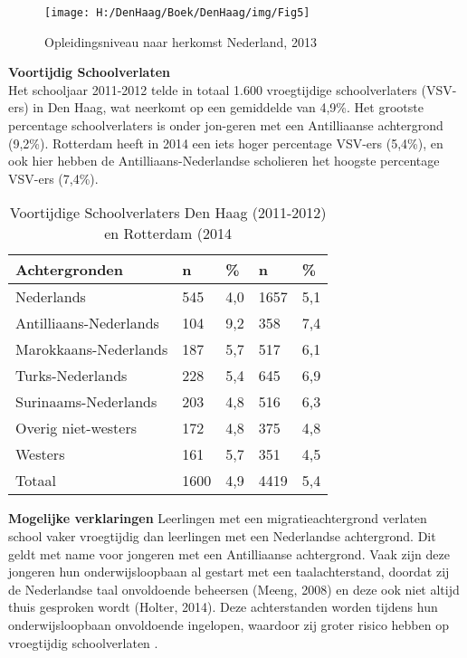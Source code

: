 \documentclass[]{book}
\begin{document}
\begin{figure}
\texttt{[image: H:/DenHaag/Boek/DenHaag/img/Fig5]} \caption{Opleidingsniveau naar herkomst Nederland, 2013}\label{fig:unnamed-chunk-5}
\end{figure}

\textbf{Voortijdig Schoolverlaten}\\
Het schooljaar 2011-2012 telde in totaal 1.600 vroegtijdige
schoolverlaters (VSV-ers) in Den Haag, wat neerkomt op een gemiddelde
van 4,9\%. Het grootste percentage schoolverlaters is onder jon-geren
met een Antilliaanse achtergrond (9,2\%). Rotterdam heeft in 2014 een
iets hoger percentage VSV-ers (5,4\%), en ook hier hebben de
Antilliaans-Nederlandse scholieren het hoogste percentage VSV-ers
(7,4\%).

\begin{table}

\caption{\label{tab:unnamed-chunk-6}Voortijdige Schoolverlaters Den Haag (2011-2012) en Rotterdam (2014}
\centering
\begin{tabular}[t]{l|l|l|l|l}
\hline
Achtergronden & n & \% & n & \%\\
\hline
Nederlands & 545 & 4,0 & 1657 & 5,1\\
\hline
Antilliaans-Nederlands & 104 & 9,2 & 358 & 7,4\\
\hline
Marokkaans-Nederlands & 187 & 5,7 & 517 & 6,1\\
\hline
Turks-Nederlands & 228 & 5,4 & 645 & 6,9\\
\hline
Surinaams-Nederlands & 203 & 4,8 & 516 & 6,3\\
\hline
Overig niet-westers & 172 & 4,8 & 375 & 4,8\\
\hline
Westers & 161 & 5,7 & 351 & 4,5\\
\hline
Totaal & 1600 & 4,9 & 4419 & 5,4\\
\hline
\end{tabular}
\end{table}

\textbf{Mogelijke verklaringen} Leerlingen met een migratieachtergrond
verlaten school vaker vroegtijdig dan leerlingen met een Nederlandse
achtergrond. Dit geldt met name voor jongeren met een Antilliaanse
achtergrond. Vaak zijn deze jongeren hun onderwijsloopbaan al gestart
met een taalachterstand, doordat zij de Nederlandse taal onvoldoende
beheersen (Meeng, 2008) en deze ook niet altijd thuis gesproken wordt
(Holter, 2014). Deze achterstanden worden tijdens hun onderwijsloopbaan
onvoldoende ingelopen, waardoor zij groter risico hebben op vroegtijdig
schoolverlaten \citep{Meeng2008}.
\end{document}
